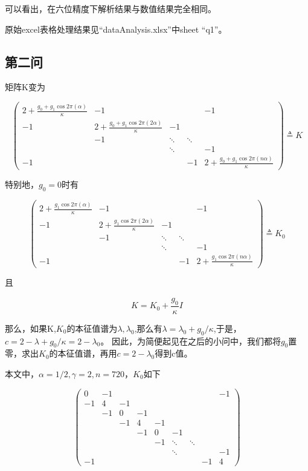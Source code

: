 \documentclass[10pt, a4paper]{article}
\begin{document}
    可以看出，在六位精度下解析结果与数值结果完全相同。

    原始excel表格处理结果见“dataAnalysis.xlsx”中sheet “q1”。

    \subsection{第二问}

    矩阵K变为

    \[
        \begin{pmatrix}
            2+\frac{g_0+g_1\cos 2\pi(\alpha)}{\kappa}&-1& & &-1\\
            -1&2+\frac{g_0+g_1\cos 2\pi(2\alpha)}{\kappa}&-1& &\\
             &-1&\ddots&\ddots& \\
             & &\ddots& &-1\\
            -1& & &-1&2+\frac{g_0+g_1\cos 2\pi(n\alpha)}{\kappa} 
        \end{pmatrix}
        \triangleq K
    \]

    特别地，$g_0=0$时有

    \[
        \begin{pmatrix}
            2+\frac{g_1\cos 2\pi(\alpha)}{\kappa}&-1& & &-1\\
            -1&2+\frac{g_1\cos 2\pi(2\alpha)}{\kappa}&-1& &\\
             &-1&\ddots&\ddots& \\
             & &\ddots& &-1\\
            -1& & &-1&2+\frac{g_1\cos 2\pi(n\alpha)}{\kappa} 
        \end{pmatrix}
        \triangleq K_0
    \]

    且

    \[K=K_0+\frac{g_0}{\kappa}I\]

    那么，如果K,$K_0$的本征值谱为$\lambda,\lambda_0$,那么有$\lambda=\lambda_0+g_0/\kappa$,于是，$c=2-\lambda+g_0/\kappa=2-\lambda_0$。
    因此，为简便起见在之后的小问中，我们都将$g_0$置零，求出$K_0$的本征值谱，再用$c=2-\lambda_0$得到c值。

    本文中，$\alpha=1/2,\gamma=2,n=720$，$K_0$如下

    \[
        \begin{pmatrix}
            0&-1& & & & & & &-1\\
            -1&4&-1& & & & & &\\
             &-1&0&-1& & & & & \\
             & &-1&4& -1& & & &\\
             & & &-1&0&-1& & &\\
             &&&&-1 & \ddots&\ddots& \\
             &&&&& \ddots& && -1\\
            -1& & & & & & &-1&4 
        \end{pmatrix}
    \]
\end{document}
